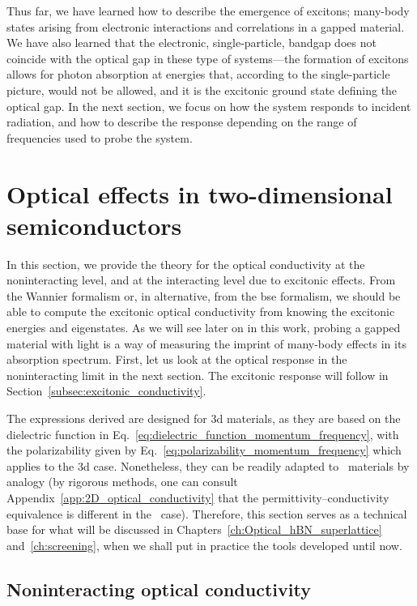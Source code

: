 Thus far, we have learned how to describe the emergence of excitons; many-body states arising from electronic interactions and correlations in a gapped material.
We have also learned that the electronic, single-particle, bandgap does not coincide with the optical gap in these type of systems---the formation of excitons allows for photon absorption at energies that, according to the single-particle picture, would not be allowed, and it is the excitonic ground state defining the optical gap.
In the next section, we focus on how the system responds to incident radiation, and how to describe the response depending on the range of frequencies used to probe the system.

\section{Optical effects in two-dimensional semiconductors}
\label{sec:optical_effects}

In this section, we provide the theory for the optical conductivity at the noninteracting level, and at the interacting level due to excitonic effects.
From the Wannier formalism or, in alternative, from the \gls{bse} formalism, we should be able to compute the excitonic optical conductivity from knowing the excitonic energies and eigenstates.
As we will see later on in this work, probing a gapped material with light is a way of measuring the imprint of many-body effects in its absorption spectrum.
First, let us look at the optical response in the noninteracting limit in the next section.
The excitonic response will follow in Section~\ref{subsec:excitonic_conductivity}.

The expressions derived are designed for \gls{3d} materials, as they are based on the dielectric function in Eq.~\eqref{eq:dielectric_function_momentum_frequency}, with the polarizability given by Eq.~\eqref{eq:polarizability_momentum_frequency} which applies to the \gls{3d} case.
Nonetheless, they can be readily adapted to \bd~materials by analogy (by rigorous methods, one can consult Appendix~\ref{app:2D_optical_conductivity} that the permittivity--conductivity equivalence is different in the \bd~case).
Therefore, this section serves as a technical base for what will be discussed in Chapters~\ref{ch:Optical_hBN_superlattice} and~\ref{ch:screening}, when we shall put in practice the tools developed until now.

\subsection{Noninteracting optical conductivity}
\label{subsec:non_interacting_conductivity}

